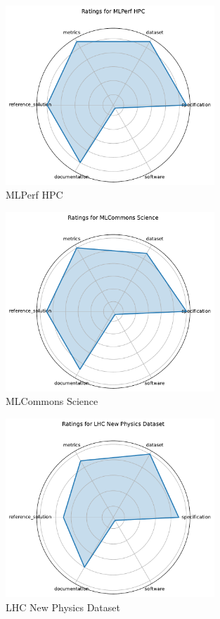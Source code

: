 \documentclass{article}
\begin{document}
\begin{figure}[h!]
  \centering
  \includegraphics[width=0.7\textwidth]{MLPerf HPC_radar.pdf}
  \caption{MLPerf HPC}
\end{figure}

\begin{figure}[h!]
  \centering
  \includegraphics[width=0.7\textwidth]{MLCommons Science_radar.pdf}
  \caption{MLCommons Science}
\end{figure}

\begin{figure}[h!]
  \centering
  \includegraphics[width=0.7\textwidth]{LHC New Physics Dataset_radar.pdf}
  \caption{LHC New Physics Dataset}
\end{figure}
\end{document}
